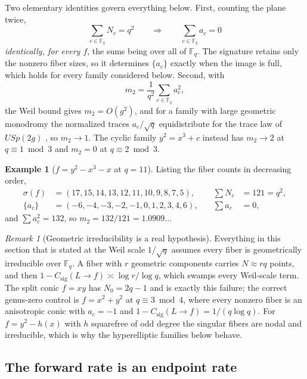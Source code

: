 \documentclass[11pt]{article}
\theoremstyle{definition}
\newtheorem{example}[definition]{Example}
\theoremstyle{plain}
\theoremstyle{remark}
\newtheorem{remark}[definition]{Remark}
\newcommand{\F}{\mathbb F}
\newcommand{\csig}{C_{\mathrm{sig}}}
\begin{document}
Two elementary identities govern everything below.  First, counting the plane
twice,
\begin{equation}
  \sum_{c\in\F_q}N_c=q^2
  \qquad\Longrightarrow\qquad
  \sum_{c\in\F_q}a_c=0
  \label{eq:first-moment}
\end{equation}
\emph{identically, for every \(f\)}, the sums being over all of \(\F_q\).  The
signature retains only the nonzero fiber sizes, so it determines \(\{a_c\}\)
exactly when the image is full, which holds for every family considered below.
Second, with
\begin{equation}
  m_2=\frac1{q^2}\sum_{c\in\F_q}a_c^2 ,
  \label{eq:m2-def}
\end{equation}
the Weil bound gives \(m_2=O(g^2)\), and for a family with large geometric
monodromy the normalized traces \(a_c/\sqrt q\) equidistribute for the trace
law of \(USp(2g)\) \cite{katz-sarnak}, so \(m_2\to1\).  The cyclic family
\(y^2=x^3+c\) instead has \(m_2\to2\) at \(q\equiv1\bmod3\) and \(m_2=0\) at
\(q\equiv2\bmod3\).

\begin{example}[\(f=y^2-x^3-x\) at \(q=11\)]
Listing the fiber counts in decreasing order,
\[
\begin{aligned}
  \sigma(f)&=(17,15,14,13,12,11,10,9,8,7,5), &\quad \textstyle\sum N_c&=121=q^2,\\
  \{a_c\}&=(-6,-4,-3,-2,-1,0,1,2,3,4,6),     &\quad \textstyle\sum a_c&=0,
\end{aligned}
\]
and \(\sum a_c^2=132\), so \(m_2=132/121=1.0909\ldots\)
\end{example}

\begin{remark}[Geometric irreducibility is a real hypothesis]
\label{rem:geom-irred}
Everything in this section that is stated at the Weil scale \(1/\sqrt q\)
assumes every fiber is geometrically irreducible over \(\F_q\).  A fiber with
\(r\) geometric components carries \(N\approx rq\) points, and then
\(1-\csig(L\to f)\asymp \log r/\log q\), which swamps every Weil-scale term.
The split conic \(f=xy\) has \(N_0=2q-1\) and is exactly this failure; the
correct genus-zero control is \(f=x^2+y^2\) at \(q\equiv3\bmod4\), where every
nonzero fiber is an anisotropic conic with \(a_c=-1\) and
\(1-\csig(L\to f)=1/(q\log q)\).  For \(f=y^2-h(x)\) with \(h\) squarefree of
odd degree the singular fibers are nodal and irreducible, which is why the
hyperelliptic families below behave.
\end{remark}

\subsection{The forward rate is an endpoint rate}
\end{document}
